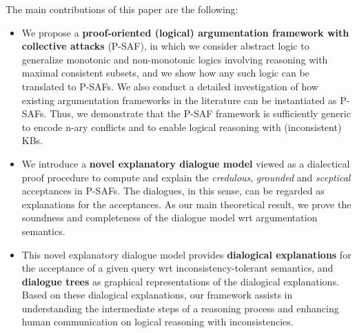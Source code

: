 
The main contributions of this paper are the following:
\begin{itemize}
    \item We propose a \textbf{proof-oriented (logical) argumentation framework with collective attacks} (P-SAF), 
    in which we consider abstract logic to generalize monotonic and non-monotonic logics involving reasoning with maximal consistent subsets, and we show how any such logic can be translated to P-SAFs.
    We also conduct a detailed investigation of how existing argumentation frameworks in the literature can be instantiated as P-SAFs.
    Thus, we demonstrate that the P-SAF framework is sufficiently generic to encode n-ary conflicts and to enable logical reasoning with (inconsistent) KBs. 
    
    


    \item We introduce a \textbf{novel explanatory dialogue model} viewed as a dialectical proof procedure to compute and explain the \textit{credulous}, \textit{grounded} and \textit{sceptical} acceptances in P-SAFs. The dialogues, in this sense, can be regarded as explanations for the acceptances. As our main theoretical result, we prove the soundness and completeness of the dialogue model wrt argumentation semantics.
    
    
    \item This novel explanatory dialogue model provides \textbf{dialogical explanations} for the acceptance of a given query wrt inconsistency-tolerant semantics, and  \textbf{dialogue trees} as graphical representations of the dialogical explanations. Based on these dialogical explanations, our framework assists in understanding the intermediate steps of a reasoning process and enhancing human communication on logical reasoning with inconsistencies.
    \end{itemize}
    


    



    
